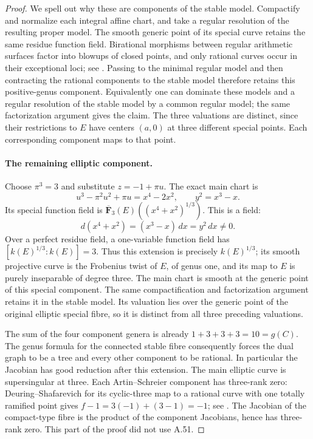 \begin{proof}
We spell out why these are components of the stable model. Compactify
and normalize each integral affine chart, and take a regular resolution
of the resulting proper model. The smooth generic point of its special
curve retains the same residue function field. Birational morphisms
between regular arithmetic surfaces factor into blowups of closed
points, and only rational curves occur in their exceptional loci;
see \cite[Theorem 9.2.2 and Remark 9.2.6, pp.~395--396,
Theorem 9.3.21, p.~422]{fghLiu}. Passing to the minimal regular
model and then contracting the rational components to the stable model
therefore retains this positive-genus component. Equivalently one can
dominate these models and a regular resolution of the stable model by
a common regular model; the same factorization argument gives the
claim. The three valuations are distinct, since their restrictions to
\(E\) have centers \((a,0)\) at three different special points.
Each corresponding component maps to that point.

\paragraph{The remaining elliptic component.}
Choose \(\pi^3=3\) and substitute \(z=-1+\pi u\). The exact main
chart is
\[
       u^3-\pi^2u^2+\pi u=x^4-2x^2,
                         \qquad y^2=x^3-x.           \tag{A.52.4}
\]
Its special function field is
\(\overline{\mathbf F}_3(E)((x^4+x^2)^{1/3})\). This is a field:
\[
                 d(x^4+x^2)=(x^3-x)\,dx=y^2\,dx\ne0.
\]
Over a perfect residue field, a one-variable function field has
\([k(E)^{1/3}:k(E)]=3\). Thus this extension is precisely
\(k(E)^{1/3}\); its smooth projective curve is the Frobenius twist
of \(E\), of genus one, and its map to \(E\) is purely inseparable
of degree three. The main chart is smooth at the generic point of
this special component. The same compactification and factorization
argument retains it in the stable model. Its valuation lies over the
generic point of the original elliptic special fibre, so it is
distinct from all three preceding valuations.

The sum of the four component genera is already
\(1+3+3+3=10=g(C)\). The genus formula for the connected stable
fibre consequently forces the dual graph to be a tree and every
other component to be rational. In particular the Jacobian has good
reduction after this extension. The main elliptic curve is
supersingular at three. Each Artin--Schreier component has three-rank
zero: Deuring--Shafarevich for its cyclic-three map to a rational
curve with one totally ramified point gives
\(f-1=3(-1)+(3-1)=-1\); see
\cite[formula (6), p.~5]{fghGiuliettiKorchmaros}.
The Jacobian of the compact-type fibre is the product of the component
Jacobians, hence has three-rank zero. This part of the proof did not
use A.51.


\end{proof}

